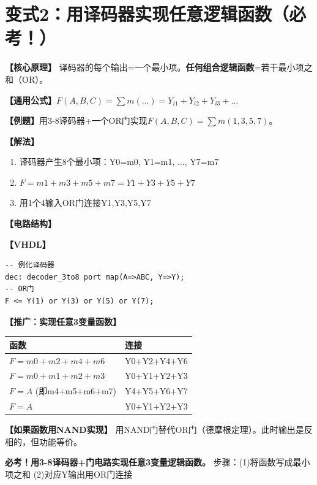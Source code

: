 \section{变式2：用译码器实现任意逻辑函数（必考！）}

\begin{detailbox}[完整教学]

\textbf{【核心原理】}
译码器的每个输出=一个最小项。\textbf{任何组合逻辑函数}=若干最小项之和（OR）。

\textbf{【通用公式】}$F(A,B,C) = \sum m(\dots)= Y_{i1}+Y_{i2}+Y_{i3}+\dots$

\textbf{【例题】}用3-8译码器+一个OR门实现$F(A,B,C)=\sum m(1,3,5,7)$。

\textbf{【解法】}
\begin{enumerate}
  \item 译码器产生8个最小项：Y0=m0, Y1=m1, ..., Y7=m7
  \item $F = m1+m3+m5+m7 = Y1+Y3+Y5+Y7$
  \item 用1个4输入OR门连接Y1,Y3,Y5,Y7
\end{enumerate}

\textbf{【电路结构】}
\begin{center}
\end{center}

\textbf{【VHDL】}
\begin{lstlisting}
-- 例化译码器
dec: decoder_3to8 port map(A=>ABC, Y=>Y);
-- OR门
F <= Y(1) or Y(3) or Y(5) or Y(7);
\end{lstlisting}

\textbf{【推广：实现任意3变量函数】}
\begin{center}
\begin{tabular}{|l|l|}
\hline
\textbf{函数} & \textbf{连接} \\
\hline
$F=m0+m2+m4+m6$ & Y0+Y2+Y4+Y6 \\
$F=m0+m1+m2+m3$ & Y0+Y1+Y2+Y3 \\
$F=A$ (即m4+m5+m6+m7) & Y4+Y5+Y6+Y7 \\
$F=\overline{A}$ & Y0+Y1+Y2+Y3 \\
\hline
\end{tabular}
\end{center}

\textbf{【如果函数用NAND实现】}
用NAND门替代OR门（德摩根定理）。此时输出是反相的，但功能等价。

\begin{examfocus}
\textbf{必考！用3-8译码器+门电路实现任意3变量逻辑函数。}
步骤：(1)将函数写成最小项之和 (2)对应Y输出用OR门连接
\end{examfocus}

\end{detailbox}


